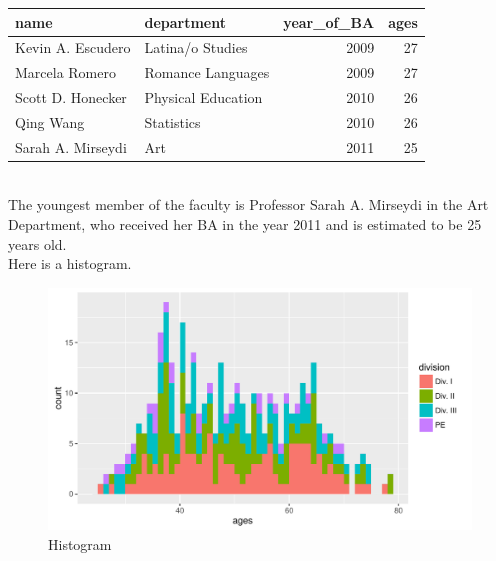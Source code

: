 \documentclass{article}\usepackage[]{graphicx}\usepackage[]{color}
\makeatletter
\def\maxwidth{ %
  \ifdim\Gin@nat@width>\linewidth
    \linewidth
  \else
    \Gin@nat@width
  \fi
}
\newenvironment{knitrout}{}{} %
\makeatother
\begin{document}
\begin{knitrout}
\color{fgcolor}
\begin{tabular}{l|l|r|r}
\hline
name & department & year\_of\_BA & ages\\
\hline
Kevin A. Escudero & Latina/o Studies & 2009 & 27\\
\hline
Marcela Romero & Romance Languages & 2009 & 27\\
\hline
Scott D. Honecker & Physical Education & 2010 & 26\\
\hline
Qing Wang & Statistics & 2010 & 26\\
\hline
Sarah A. Mirseydi & Art & 2011 & 25\\
\hline
\end{tabular}


\end{knitrout}
\hfill
\\
The youngest member of the faculty is Professor Sarah A. Mirseydi in the Art Department, who received her BA in the year 2011 and is estimated to be 25 years old.\\

Here is a histogram.

\begin{knitrout}
\color{fgcolor}\begin{figure}[h]
\includegraphics[width=\maxwidth]{figure/unnamed-chunk-4-1} \caption[Histogram]{Histogram}\label{fig:unnamed-chunk-4}
\end{figure}


\end{knitrout}
\end{document}
